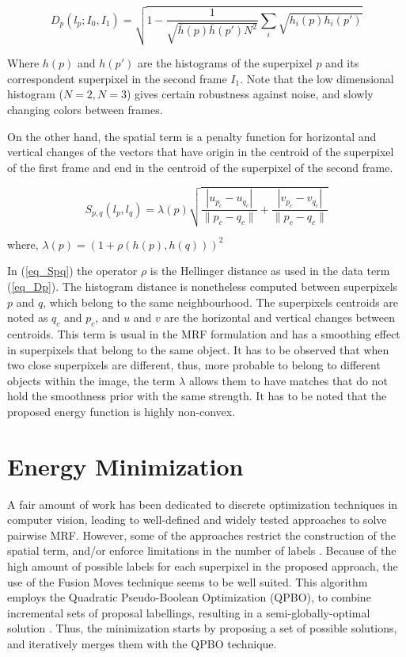 \begin{equation}
D_p(l_p;I_0,I_1) = \sqrt{ 1 - \frac{1}{\sqrt{\bar{h}(p)\bar{h}(p')N^2} } \sum_{i}\sqrt{h_{i}(p)h_{i}(p')} }
\label{eq_Dp}
\end{equation}

Where $h(p)$ and $h(p')$ are the histograms of the superpixel $p$ and its correspondent superpixel in the
second frame $I_1$. 
Note that the low dimensional histogram ($N=2, N=3$) gives certain robustness against noise,
and slowly changing colors between frames. 

On the other hand, the spatial term is a penalty function for horizontal
and vertical changes of the vectors that have origin in the centroid of the superpixel of the first frame and
end in the centroid of the superpixel of the second frame.

\begin{equation}
S_{p,q}(l_p, l_q) = \lambda(p)
  \sqrt{\frac{|u_{p_c}-u_{q_c}|}{\|p_c-q_c\|}+ \frac{|v_{p_c}-v_{q_c}|}{\|p_c-q_c\|}}
\label{eq_Spq}
\end{equation}
\begin{center}
 where, $ \lambda(p) = (1 + \rho(h(p),h(q)))^2 $ \\
\end{center}

In (\ref{eq_Spq}) the operator $\rho$ is the Hellinger distance as used in the
data term (\ref{eq_Dp}). The histogram distance is nonetheless computed between superpixels $p$ and $q$, 
which belong to the same neighbourhood. The superpixels centroids are noted as $q_c$ and $p_c$, 
and $u$ and $v$ are the horizontal and vertical changes between centroids.
This term is usual in the MRF formulation and has a smoothing effect in superpixels that belong to the
same object. It has to be observed that when two close superpixels are different, thus, more probable to
belong to different objects within the image, the term $\lambda$ allows them to have
matches that do not hold the smoothness prior with the same strength. 
It has to be noted that the proposed energy function is highly non-convex.

\section{Energy Minimization}

A fair amount of work has been dedicated to discrete optimization techniques in computer vision,
leading to well-defined and widely tested approaches to solve pairwise MRF\cite{c3}\cite{c4}.
However, some of the approaches restrict the construction of the spatial term, and/or enforce
limitations in the number of labels \cite{c3}.
Because of the high amount of possible labels for  each superpixel in the proposed approach, the use of the
Fusion Moves \cite{c7} technique seems to be well suited.
This algorithm employs the Quadratic Pseudo-Boolean Optimization (QPBO), to combine
incremental sets of proposal labellings, resulting in a semi-globally-optimal solution \cite{c4}.
Thus, the minimization starts by proposing a set of possible solutions, and iteratively merges them with
the QPBO technique. 

